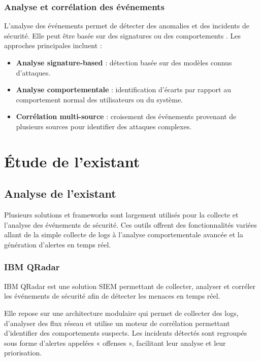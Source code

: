 \documentclass[a4paper,12pt]{report}
\begin{document}
    \subsubsection{Analyse et corrélation des événements}
    
    L’analyse des événements permet de détecter des anomalies et des incidents de sécurité. Elle peut être basée sur des signatures ou des comportements \cite{ids}. Les approches principales incluent :
    
    \begin{itemize}
        \item \textbf{Analyse signature-based} : détection basée sur des modèles connus d’attaques.
        \item \textbf{Analyse comportementale} : identification d’écarts par rapport au comportement normal des utilisateurs ou du système.
        \item \textbf{Corrélation multi-source} : croisement des événements provenant de plusieurs sources pour identifier des attaques complexes.
    \end{itemize}
    
    \section{Étude de l'existant}
    
    \subsection{Analyse de l'existant}
       
    Plusieurs solutions et frameworks sont largement utilisés pour la collecte et l’analyse des événements de sécurité. Ces outils offrent des fonctionnalités variées allant de la simple collecte de logs à l’analyse comportementale avancée et la génération d’alertes en temps réel.
    
    \subsubsection{IBM QRadar}
    
    IBM QRadar est une solution SIEM permettant de collecter, analyser et corréler les événements de sécurité \cite{qradar} afin de détecter les menaces en temps réel.
    
    Elle repose sur une architecture modulaire qui permet de collecter des logs, d'analyser des flux réseau et utilise un moteur de corrélation permettant d’identifier des comportements suspects. Les incidents détectés sont regroupés sous forme d’alertes appelées « offenses », facilitant leur analyse et leur priorisation.
    
\end{document}
